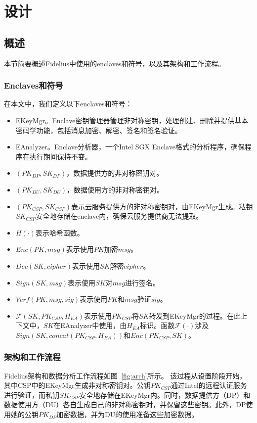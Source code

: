 \section{设计}\label{sec:design}

\subsection{概述}
本节简要概述Fidelius中使用的enclaves和符号，以及其架构和工作流程。


\subsubsection{Enclaves和符号}
在本文中，我们定义以下enclaves和符号：
\begin{itemize}
    \item EKeyMgr。Enclave密钥管理器管理非对称密钥，处理创建、删除并提供基本密码学功能，包括消息加密、解密、签名和签名验证。
    \item EAnalyzer。Enclave分析器，一个Intel SGX Enclave格式的分析程序，确保程序在执行期间保持不变。
    \item $(PK_{DP},SK_{DP})$，数据提供方的非对称密钥对。
    \item $(PK_{DU},SK_{DU})$，数据使用方的非对称密钥对。
    \item $(PK_{CSP}, SK_{CSP})$表示云服务提供方的非对称密钥对，由EKeyMgr生成。私钥$SK_{CSP}$安全地存储在enclave内，确保云服务提供商无法提取。
    \item $H(\cdot)$表示哈希函数。
    \item $Enc(PK, msg)$表示使用$PK$加密$msg$。
    \item $Dec(SK, cipher)$表示使用$SK$解密$cipher$。
    \item $Sign(SK, msg)$表示使用$SK$对$msg$进行签名。
    \item $Verf(PK, msg, sig)$表示使用$PK$和$msg$验证$sig$。
    \item $\mathcal{F}(SK, PK_{CSP}, H_{EA})$表示使用$PK_{CSP}$将$SK$转发到EKeyMgr的过程。在此上下文中，$SK$在EAnalyzer中使用，由$H_{EA}$标识。函数$\mathcal{F}(\cdot)$涉及$Sign(SK, concat(PK_{CSP}, H_{EA}))$和$Enc(PK_{CSP}, SK)$。
\end{itemize}

\subsubsection{架构和工作流程}

Fidelius架构和数据分析工作流程如图~\ref{fig:arch}所示。
该过程从设置阶段开始，其中CSP中的EKeyMgr生成非对称密钥对。公钥$PK_{CSP}$通过Intel的远程认证服务进行验证，而私钥$SK_{CSP}$安全地存储在EKeyMgr内。同时，数据提供方（DP）和数据使用方（DU）各自生成自己的非对称密钥对，并保留这些密钥。此外，DP使用她的公钥$PK_{DP}$加密数据，并为DU的使用准备这些加密数据。

